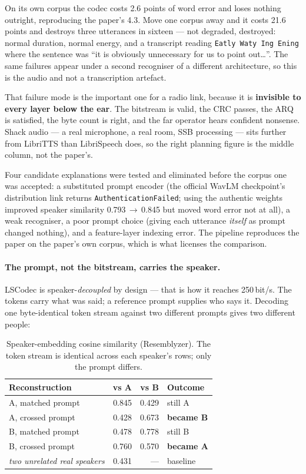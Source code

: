 On its own corpus the codec costs 2.6 points of word error and loses
nothing outright, reproducing the paper's 4.3.  Move one corpus away
and it costs 21.6 points and destroys three utterances in sixteen ---
not degraded, destroyed: normal duration, normal energy, and a
transcript reading \texttt{Eatly Waty Ing Ening} where the sentence
was ``it is obviously unnecessary for us to point out\ldots''.  The
same failures appear under a second recogniser of a different
architecture, so this is the audio and not a transcription artefact.

That failure mode is the important one for a radio link, because it is
\textbf{invisible to every layer below the ear}.  The bitstream is
valid, the CRC passes, the ARQ is satisfied, the byte count is right,
and the far operator hears confident nonsense.  Shack audio --- a real
microphone, a real room, SSB processing --- sits further from LibriTTS
than LibriSpeech does, so the right planning figure is the middle
column, not the paper's.

Four candidate explanations were tested and eliminated before the
corpus one was accepted: a substituted prompt encoder (the official
WavLM checkpoint's distribution link returns
\texttt{AuthenticationFailed}; using the authentic weights improved
speaker similarity 0.793\,$\rightarrow$\,0.845 but moved word error not
at all), a weak recogniser, a poor prompt choice (giving each utterance
\emph{itself} as prompt changed nothing), and a feature-layer indexing
error.  The pipeline reproduces the paper on the paper's own corpus,
which is what licenses the comparison.

\paragraph{The prompt, not the bitstream, carries the speaker.}
LSCodec is speaker-\emph{decoupled} by design --- that is how it
reaches 250\,bit/s.  The tokens carry what was said; a reference prompt
supplies who says it.  Decoding one byte-identical token stream against
two different prompts gives two different people:

\begin{table}[H]
    \centering
    \caption{Speaker-embedding cosine similarity (Resemblyzer).  The
             token stream is identical across each speaker's rows; only
             the prompt differs.}
    \label{tab:voice_identity}
    \small
    \begin{tabular}{@{}lrrl@{}}
    \toprule
    \textbf{Reconstruction} & \textbf{vs A} & \textbf{vs B} &
    \textbf{Outcome} \\
    \midrule
    A, matched prompt & 0.845 & 0.429 & still A \\
    A, crossed prompt & 0.428 & 0.673 & \textbf{became B} \\
    B, matched prompt & 0.478 & 0.778 & still B \\
    B, crossed prompt & 0.760 & 0.570 & \textbf{became A} \\
    \midrule
    \emph{two unrelated real speakers} & 0.431 & --- & baseline \\
    \bottomrule
    \end{tabular}
\end{table}

